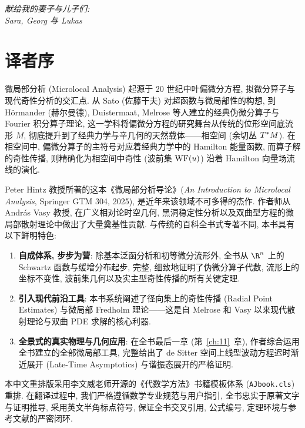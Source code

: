 
\thispagestyle{empty}
\vspace*{7cm}
\begin{flushright}
    \itshape
    献给我的妻子与儿子们:\\
    Sara, Georg 与 Lukas
\end{flushright}
\vfill
\cleardoublepage

\chapter*{译者序}

微局部分析 (Microlocal Analysis) 起源于 20 世纪中叶偏微分方程, 拟微分算子与现代奇性分析的交汇点. 从 Sato (佐藤干夫) 对超函数与微局部性的构想, 到 Hörmander (赫尔曼德), Duistermaat, Melrose 等人建立的经典伪微分算子与 Fourier 积分算子理论, 这一学科将偏微分方程的研究舞台从传统的位形空间底流形 $M$, 彻底提升到了经典力学与辛几何的天然载体——相空间 (余切丛 $T^* M$). 在相空间中, 偏微分算子的主符号对应着经典力学中的 Hamilton 能量函数, 而算子解的奇性传播, 则精确化为相空间中奇性 (波前集 $\operatorname{WF}(u)$) 沿着 Hamilton 向量场流线的演化.

Peter Hintz 教授所著的这本《微局部分析导论》(\emph{An Introduction to Microlocal Analysis}, Springer GTM 304, 2025), 是近年来该领域不可多得的杰作. 作者师从 András Vasy 教授, 在广义相对论时空几何, 黑洞稳定性分析以及双曲型方程的微局部散射理论中做出了大量奠基性贡献. 与传统的百科全书式专著不同, 本书具有以下鲜明特色:
\begin{enumerate}
    \item \textbf{自成体系, 步步为营}: 除基本泛函分析和初等微分流形外, 全书从 $\R^n$ 上的 Schwartz 函数与缓增分布起步, 完整, 细致地证明了伪微分算子代数, 流形上的坐标不变性, 波前集几何以及实主型奇性传播的所有关键定理.
    \item \textbf{引入现代前沿工具}: 本书系统阐述了径向集上的奇性传播 (Radial Point Estimates) 与微局部 Fredholm 理论——这是自 Melrose 和 Vasy 以来现代散射理论与双曲 PDE 求解的核心利器.
    \item \textbf{全景式的真实物理与几何应用}: 在全书最后一章 (第~\ref{ch:11}~章), 作者综合运用全书建立的全部微局部工具, 完整给出了 de Sitter 空间上线型波动方程迟时渐近展开 (Late-Time Asymptotics) 与谐振态展开的严格证明.
\end{enumerate}

本中文重排版采用李文威老师开源的《代数学方法》书籍模板体系 (\texttt{AJbook.cls}) 重排. 在翻译过程中, 我们严格遵循数学专业规范与用户指引, 全书忠实于原著文字与证明推导, 采用英文半角标点符号, 保证全书交叉引用, 公式编号, 定理环境与参考文献的严密闭环.

